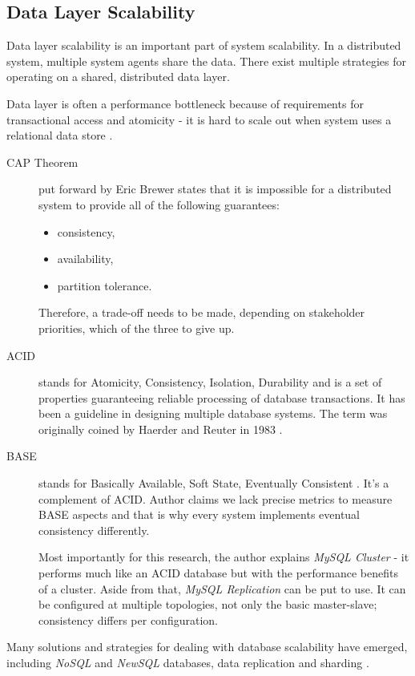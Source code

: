 \documentclass{uvamscse}
\begin{document}
\subsection{Data Layer Scalability}\label{Data Layer Scalability}

Data layer scalability is an important part of system scalability. In a distributed system, multiple system agents share the data. There exist multiple strategies for operating on a shared, distributed data layer.

Data layer is often a performance bottleneck because of requirements for transactional access and atomicity - it is hard to scale out when system uses a relational data store \cite{GroBuy}.

\begin{description}
  \item[CAP Theorem]
  put forward by Eric Brewer \cite{Cap} states that it is impossible for a distributed system to provide all of the following guarantees:
  \begin{itemize}
    \item consistency,
    \item availability,
    \item partition tolerance.
  \end{itemize}
  Therefore, a trade-off needs to be made, depending on stakeholder priorities, which of the three to give up.
  \item[ACID]
   stands for Atomicity, Consistency, Isolation, Durability and is a set of properties guaranteeing reliable processing of database transactions. It has been a guideline in designing multiple database systems. The term was originally coined by Haerder and Reuter in 1983 \cite{ACID}.
  \item[BASE]
   stands for Basically Available, Soft State, Eventually Consistent \cite{EveCon}. It’s a complement of ACID. Author claims we lack precise metrics to measure BASE aspects and that is why every system implements eventual consistency differently.

  Most importantly for this research, the author \cite{EveCon} explains \textit{MySQL Cluster} - it performs much like an ACID database but with the performance benefits of a cluster. Aside from that, \textit{MySQL Replication} can be put to use. It can be configured at multiple topologies, not only the basic master-slave; consistency differs per configuration.
\end{description}

Many solutions and strategies for dealing with database scalability have emerged, including \textit{NoSQL} and \textit{NewSQL} databases, data replication and sharding \cite{Amza}.
\end{document}

